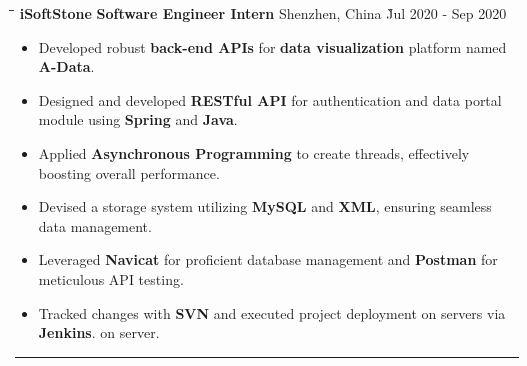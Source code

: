 \documentclass{res}
\begin{document}
\begin{resume}
    \vspace{-0.1in}	
    \begin{tabbing}
    \hspace{1.5in}\= \hspace{2.5in}\= \hspace{1.6in}\= \kill %
        {\bf iSoftStone} \> {\bf Software Engineer Intern}  \>  
                                    Shenzhen, China   \` Jul 2020 - Sep 2020\\
    \end{tabbing}\vspace{-20pt}      %
    \vspace{+0.1in}
    \begin{itemize} \itemsep 1.5pt %
        \item Developed robust {\bf back-end APIs} for {\bf data visualization} 
            platform named {\bf A-Data}.
        \item Designed and developed {\bf RESTful API} for authentication and 
                data portal module using {\bf Spring} and {\bf Java}.
        \item Applied {\bf Asynchronous Programming} to create threads, effectively boosting overall performance.
        \item Devised a storage system utilizing {\bf MySQL} and {\bf XML}, ensuring seamless data management.
        \item Leveraged {\bf Navicat} for proficient database management and {\bf Postman} for meticulous API testing.
        \item Tracked changes with {\bf SVN} and executed project deployment on servers via {\bf Jenkins}.
                on server.
    \end{itemize}

\vspace{+0.05in}

\vspace{-8pt}
\hspace{-0.55in}
\noindent\rule[0.25\baselineskip]{19.36cm}{0.5pt}    
        


\end{resume}
\end{document}
